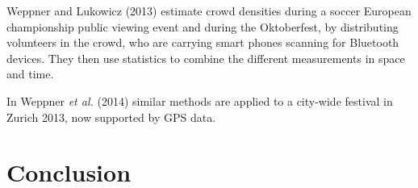 \documentclass[10pt,a4paper]{article}
\begin{document}
Weppner and Lukowicz (2013) \cite{weppner:1} estimate crowd densities during a soccer European championship public viewing event and during the Oktoberfest, by distributing volunteers in the crowd, who are carrying smart phones scanning for Bluetooth devices. They then use statistics to combine the different measurements in space and time.

In Weppner \textit{et al.} (2014) \cite{weppner:2} similar methods are applied to a city-wide festival in Zurich 2013, now supported by GPS data.



\section{Conclusion}





\end{document}

